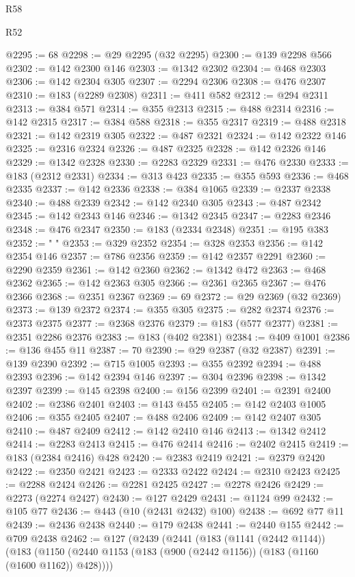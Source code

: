 \begin{lexlean}{R58}
\begin{lexlean}{R52}
\begin{coremodule}
{{{{{{{{{{{{{{{{{{{{{{{{{{{{{{{{{{{{{{{{{{{{{{{{{{{{{{{{{{{{{{{{{{{{{{{{{{{{{{{{{{{{{{{{{{{{{{{{{{{{{{{{{{{{{{{{{{{{{{{{{{{{{{{{{{{{{{{{{{{{{{{{{{{{{{{{{{{{{{{{{{{{{{{{{{{{{{{{{{{{{{{{{{{{{{{{{{{{{{@2295 := 68
@2298 := @29 @2295 (@32 @2295)
@2300 := @139 @2298 @566
@2302 := @142 @2300 @146
@2303 := @1342 @2302
@2304 := @468 @2303
@2306 := @142 @2304 @305
@2307 := @2294 @2306
@2308 := @476 @2307
@2310 := @183 (@2289 @2308)
@2311 := @411 @582
@2312 := @294 @2311
@2313 := @384 @571
@2314 := @355 @2313
@2315 := @488 @2314
@2316 := @142 @2315
@2317 := @384 @588
@2318 := @355 @2317
@2319 := @488 @2318
@2321 := @142 @2319 @305
@2322 := @487 @2321
@2324 := @142 @2322 @146
@2325 := @2316 @2324
@2326 := @487 @2325
@2328 := @142 @2326 @146
@2329 := @1342 @2328
@2330 := @2283 @2329
@2331 := @476 @2330
@2333 := @183 (@2312 @2331)
@2334 := @313 @423
@2335 := @355 @593
@2336 := @468 @2335
@2337 := @142 @2336
@2338 := @384 @1065
@2339 := @2337 @2338
@2340 := @488 @2339
@2342 := @142 @2340 @305
@2343 := @487 @2342
@2345 := @142 @2343 @146
@2346 := @1342 @2345
@2347 := @2283 @2346
@2348 := @476 @2347
@2350 := @183 (@2334 @2348)
@2351 := @195 @383
@2352 := " "
@2353 := @329 @2352
@2354 := @328 @2353
@2356 := @142 @2354 @146
@2357 := @786 @2356
@2359 := @142 @2357 @2291
@2360 := @2290 @2359
@2361 := @142 @2360
@2362 := @1342 @472
@2363 := @468 @2362
@2365 := @142 @2363 @305
@2366 := @2361 @2365
@2367 := @476 @2366
@2368 := @2351 @2367
@2369 := 69
@2372 := @29 @2369 (@32 @2369)
@2373 := @139 @2372
@2374 := @355 @305
@2375 := @282 @2374
@2376 := @2373 @2375
@2377 := @2368 @2376
@2379 := @183 (@577 @2377)
@2381 := @2351 @2286 @2376
@2383 := @183 (@402 @2381)
@2384 := @409 @1001
@2386 := @136 @455 @11
@2387 := 70
@2390 := @29 @2387 (@32 @2387)
@2391 := @139 @2390
@2392 := @715 @1005
@2393 := @355 @2392
@2394 := @488 @2393
@2396 := @142 @2394 @146
@2397 := @304 @2396
@2398 := @1342 @2397
@2399 := @145 @2398
@2400 := @156 @2399
@2401 := @2391 @2400
@2402 := @2386 @2401
@2403 := @143 @455
@2405 := @142 @2403 @1005
@2406 := @355 @2405
@2407 := @488 @2406
@2409 := @142 @2407 @305
@2410 := @487 @2409
@2412 := @142 @2410 @146
@2413 := @1342 @2412
@2414 := @2283 @2413
@2415 := @476 @2414
@2416 := @2402 @2415
@2419 := @183 (@2384 @2416) @428
@2420 := @2383 @2419
@2421 := @2379 @2420
@2422 := @2350 @2421
@2423 := @2333 @2422
@2424 := @2310 @2423
@2425 := @2288 @2424
@2426 := @2281 @2425
@2427 := @2278 @2426
@2429 := @2273 (@2274 @2427)
@2430 := @127 @2429
@2431 := @1124 @99
@2432 := @105 @77
@2436 := @443 (@10 (@2431 @2432) @100)
@2438 := @692 @77 @11
@2439 := @2436 @2438
@2440 := @179 @2438
@2441 := @2440 @155
@2442 := @709 @2438
@2462 := @127
    (@2439
      (@2441
        (@183
          (@1141 (@2442 @1144))
          (@183
            (@1150 (@2440 @1153 (@183 (@900 (@2442 @1156)) (@183 (@1160 (@1600 @1162)) @428))))
}}}}}}}}}}}}}}}}}}}}}}}}}}}}}}}}}}}}}}}}}}}}}}}}}}}}}}}}}}}}}}}}}}}}}}}}}}}}}}}}}}}}}}}}}}}}}}}}}}}}}}}}}}}}}}}}}}}}}}}}}}}}}}}}}}}}}}}}}}}}}}}}}}}}}}}}}}}}}}}}}}}}}}}}}}}}}}}}}}}}}}}}}}}}}}}}}}}}}}
\end{coremodule}
\end{lexlean}
\end{lexlean}
